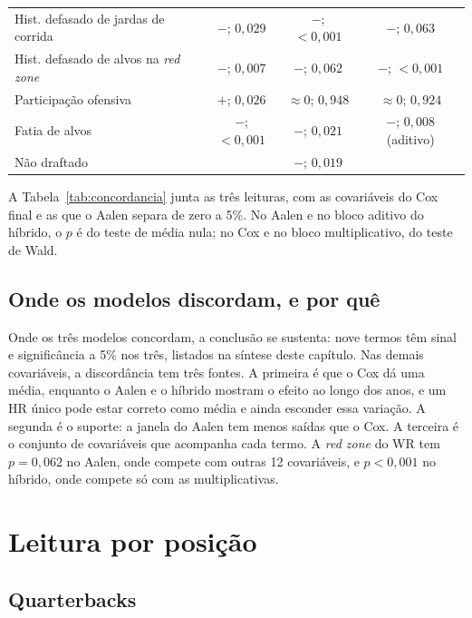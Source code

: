 \begin{table}[H]
\begin{tabularx}{\textwidth}{@{}>{\raggedright\arraybackslash}Xccc@{}}
Hist. defasado de jardas de corrida & $-$; $0{,}029$ & $-$; $<0{,}001$ & $-$; $0{,}063$ \\
Hist. defasado de alvos na \textit{red zone} & $-$; $0{,}007$ & $-$; $0{,}062$ & $-$; $<0{,}001$ \\
Participação ofensiva          & $+$; $0{,}026$  & $\approx 0$; $0{,}948$ & $\approx 0$; $0{,}924$ \\
Fatia de alvos                 & $-$; $<0{,}001$ & $-$; $0{,}021$  & $-$; $0{,}008$ (aditivo) \\
Não draftado                   & & $-$; $0{,}019$  & \\
\bottomrule
\end{tabularx}
\end{table}

A Tabela~\ref{tab:concordancia} junta as três leituras, com as covariáveis do Cox final e as que o Aalen separa de zero a 5\%. No Aalen e no bloco aditivo do híbrido, o $p$ é do teste de média nula; no Cox e no bloco multiplicativo, do teste de Wald.


\subsection{Onde os modelos discordam, e por quê}
\label{subsec:divergencias}

Onde os três modelos concordam, a conclusão se sustenta: nove termos têm sinal e significância a 5\% nos três, listados na síntese deste capítulo. Nas demais covariáveis, a discordância tem três fontes. A primeira é que o Cox dá uma média, enquanto o Aalen e o híbrido mostram o efeito ao longo dos anos, e um HR único pode estar correto como média e ainda esconder essa variação. A segunda é o suporte: a janela do Aalen tem menos saídas que o Cox. A terceira é o conjunto de covariáveis que acompanha cada termo. A \textit{red zone} do WR tem $p=0{,}062$ no Aalen, onde compete com outras 12 covariáveis, e $p<0{,}001$ no híbrido, onde compete só com as multiplicativas.


\section{Leitura por posição}
\label{sec:res_leitura}

\subsection{Quarterbacks}
\label{subsec:qb}

